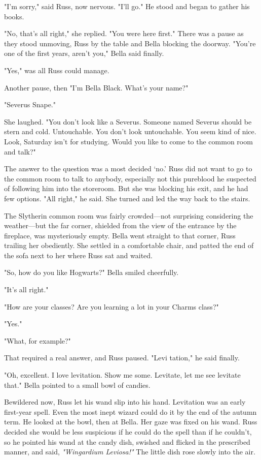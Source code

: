 "I'm{\el} sorry," said Russ, now nervous. "I'll{\el} go." He stood and began to gather his books.

"No, that's all right," she replied. "You were here first." There was a pause as they stood unmoving, Russ by the table and Bella blocking the doorway. "You're one of the first years, aren't you," Bella said finally.

"Yes," was all Russ could manage.

Another pause, then "I'm Bella Black. What's your name?"

"Seve{\el}rus Snape."

She laughed. "You don't look like a Severus. Someone named Severus should be stern and cold. Untouchable. You don't look untouchable. You seem kind of nice. Look, Saturday isn't for studying. Would you like to come to the common room and talk?"

The answer to the question was a most decided `no.' Russ did not want to go to the common room to talk to anybody, especially not this pureblood he suspected of following him into the storeroom. But she was blocking his exit, and he had few options. "All{\el} right," he said. She turned and led the way back to the stairs.

The Slytherin common room was fairly crowded—not surprising considering the weather—but the far corner, shielded from the view of the entrance by the fireplace, was mysteriously empty. Bella went straight to that corner, Russ trailing her obediently. She settled in a comfortable chair, and patted the end of the sofa next to her where Russ sat and waited.

"So, how do you like Hogwarts?" Bella smiled cheerfully.

"It's{\el} all{\el} right."

"How are your classes? Are you learning a lot in your Charms class?"

"Yes."

"What, for example?"

That required a real answer, and Russ paused. "Levi{\el} tation," he said finally.

"Oh, excellent. I love levitation. Show me some. Levitate, let me see{\el} levitate that." Bella pointed to a small bowl of candies.

Bewildered now, Russ let his wand slip into his hand. Levitation was an early first-year spell. Even the most inept wizard could do it by the end of the autumn term. He looked at the bowl, then at Bella. Her gaze was fixed on his wand. Russ decided she would be less suspicious if he could do the spell than if he couldn't, so he pointed his wand at the candy dish, swished and flicked in the prescribed manner, and said, \emph{"Wingardium Leviosa!"} The little dish rose slowly into the air.

